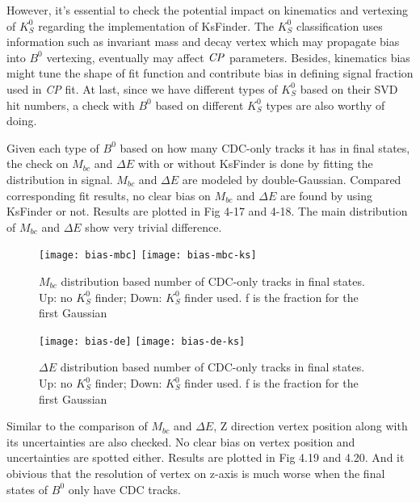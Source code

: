  However, it's essential to check the potential impact on kinematics and vertexing of $K_S^0$ regarding the implementation of KsFinder. The $K_S^0$ classification uses information such as invariant mass and decay vertex which may propagate bias into $B^0$ vertexing, eventually may affect $\it{CP}$ parameters. Besides, kinematics bias might tune the shape of fit function and contribute bias in defining signal fraction used in \textit{CP} fit. At last, since we have different types of $K_S^0$ based on their SVD hit numbers, a check with $B^0$ based on different $K_S^0$ types are also worthy of doing.
 
 Given each type of $B^0$ based on how many CDC-only tracks it has in final states, the check on $M_{bc}$ and $\Delta{E}$ with or without KsFinder is done by fitting the distribution in signal. $M_{bc}$ and $\Delta{E}$ are modeled by double-Gaussian. Compared corresponding fit results, no clear bias on $M_{bc}$ and $\Delta{E}$ are found by using KsFinder or not. Results are plotted in Fig 4-17 and 4-18. The main distribution of $M_{bc}$ and $\Delta E$ show very trivial difference. 
 \begin{figure}[htpb]
 	\centering
 	\texttt{[image: bias-mbc]}
 	\texttt{[image: bias-mbc-ks]}
 	\caption{$M_{bc}$ distribution based number of CDC-only tracks in final states. Up: no $K_S^0$ finder; Down: $K_S^0$ finder used.  f is the fraction for the first Gaussian}
 \end{figure}
 \begin{figure}[htpb]
	\centering
	\texttt{[image: bias-de]}
	\texttt{[image: bias-de-ks]}
	\caption{$\Delta{E}$ distribution based number of CDC-only tracks in final states. Up: no $K_S^0$ finder; Down: $K_S^0$ finder used. f is the fraction for the first Gaussian}
\end{figure}

Similar to the comparison of $M_{bc}$ and $\Delta{E}$, Z direction vertex position along with its uncertainties are also checked. No clear bias on vertex position and uncertainties are spotted either. Results are plotted in Fig 4.19 and 4.20. And it obivious that the resolution of vertex on z-axis is much worse when the final states of $B^0$ only have CDC tracks. 


